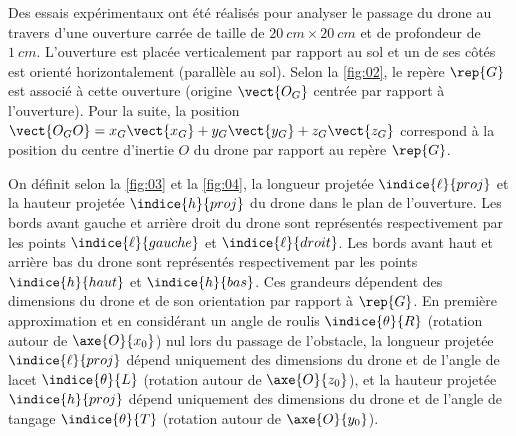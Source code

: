 \ifprof
\begin{corrige}
\end{corrige}
\else
\fi

\ifprof
\begin{corrige}
\end{corrige}
\else
\fi


Des essais expérimentaux ont été réalisés pour analyser le passage du drone au travers
d’une ouverture carrée de taille de $\SI{20}{cm} \times \SI{20}{cm}$ et de profondeur de $\SI{1}{cm}$. L’ouverture est placée verticalement par rapport au sol et un de ses côtés est orienté horizontalement
(parallèle au sol). Selon la \autoref{fig:02}, le repère $\rep{G}$ est associé à cette ouverture 
(origine $\vect{O_G}$ centrée par rapport à l’ouverture). Pour la suite, la position 
$\vect{O_G O} = x_G \vect{x_G}+y_G \vect{y_G}+z_G \vect{z_G}$
 correspond à la position du centre d’inertie $O$ du drone par rapport au repère $\rep{G}$.

On définit selon la \autoref{fig:03} et la \autoref{fig:04}, la longueur projetée $\indice{\ell}{proj}$ et la hauteur projetée $\indice{h}{proj}$ du
drone dans le plan de l’ouverture. Les bords avant gauche et arrière droit du drone sont
représentés respectivement par les points $\indice{\ell}{gauche}$ et $\indice{\ell}{droit}$. Les bords avant haut et arrière bas
du drone sont représentés respectivement par les points $\indice{h}{haut}$ et $\indice{h}{bas}$.
Ces grandeurs dépendent des dimensions du drone et de son orientation par rapport à $\rep{G}$. En
première approximation et en considérant un angle de roulis $\indice{\theta}{R}$ (rotation autour de $\axe{O}{x_0}$) nul
lors du passage de l’obstacle, la longueur projetée $\indice{\ell}{proj}$ dépend uniquement des dimensions
du drone et de l’angle de lacet $\indice{\theta}{L}$ (rotation autour de $\axe{O}{z_0}$), et la hauteur projetée $\indice{h}{proj}$ dépend
uniquement des dimensions du drone et de l’angle de tangage $\indice{\theta}{T}$ (rotation autour de $\axe{O}{y_0}$).



